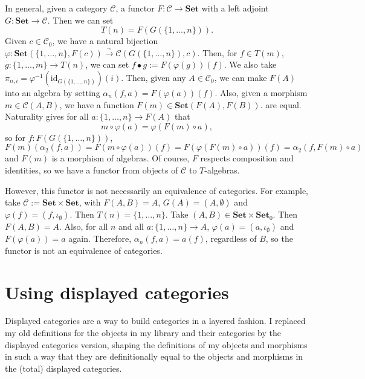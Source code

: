 \documentclass{amsbook}
\newcommand{\Catc}[1]{\mathcal{#1}}
\newcommand{\CC}{\Catc{C}}
\newcommand{\Catb}[1]{\mathbf{#1}}
\newcommand{\SET}{\Catb{Set}}
\newcommand{\Ob}[1]{{#1}_0}
\newcommand{\Hom}[3]{{#1}\left(#2,#3\right)}
\theoremstyle{definition}
\begin{document}
  In general, given a category $ \CC $, a functor $ F : \CC \to \SET $ with a left adjoint $ G : \SET \to \CC $. Then we can set
  \[ T(n) = F(G(\{1, \dots, n\})). \]
  Given $ c \in \Ob{\CC} $, we have a natural bijection $ \varphi: \Hom{\SET}{\{1, \dots, n\}}{F(c)} \xrightarrow{\sim} \Hom{\CC}{G(\{1, \dots, n\})}{c} $. Then, for $ f \in T(m) $, $ g: \{ 1, \dots, m \} \to T(n) $, we can set $ f \bullet g := F(\varphi(g))(f) $. We also take $ \pi_{n, i} = \varphi^{-1}(\mathrm{id}_{G(\{1, \dots, n\})})(i) $. Then, given any $ A \in \Ob \CC $, we can make $ F(A) $ into an algebra by setting $ \alpha_n(f, a) = F(\varphi(a))(f) $. Also, given a morphism $ m \in \Hom{\CC}{A}{B} $, we have a function $ F(m) \in \Hom{\SET}{F(A)}{F(B)} $.
  are equal. Naturality gives for all $ a: \{1, \dots, n\} \to F(A) $ that
  \[ m \circ \varphi(a) = \varphi(F(m) \circ a), \]
  so for $ f: F(G(\{1, \dots, n\})) $,
  \[ F(m)(\alpha_2(f, a)) = F(m \circ \varphi(a))(f) = F(\varphi(F(m) \circ a))(f) = \alpha_2(f, F(m) \circ a) \]
  and $ F(m) $ is a morphism of algebras. Of course, $ F $ respects composition and identities, so we have a functor from objects of $ \CC $ to $ T $-algebras.

  However, this functor is not necessarily an equivalence of categories. For example, take $ \CC := \SET \times \SET $, with $ F(A, B) = A $, $ G(A) = (A, \emptyset) $ and $ \varphi(f) = (f, \iota_\emptyset) $. Then $ T(n) = \{ 1, \dots, n\} $. Take $ (A, B) \in \Ob{\SET \times \SET} $. Then $ F(A, B) = A $. Also, for all $ n $ and all $ a: \{ 1, \dots, n \} \to A $, $ \varphi(a) = (a, \iota_\emptyset) $ and $ F(\varphi(a)) = a $ again. Therefore, $ \alpha_n(f, a) = a(f) $, regardless of $ B $, so the functor is not an equivalence of categories.

  \section{Using displayed categories}
  Displayed categories are a way to build categories in a layered fashion. I replaced my old definitions for the objects in my library and their categories by the displayed categories version, shaping the definitions of my objects and morphisms in such a way that they are definitionally equal to the objects and morphisms in the (total) displayed categories.
\end{document}
